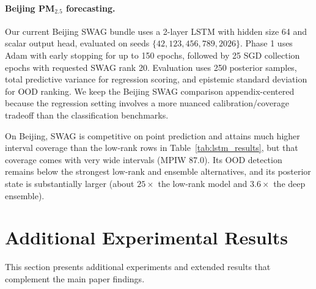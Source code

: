 \documentclass{article}
\theoremstyle{plain}
\theoremstyle{definition}
\theoremstyle{remark}
\begin{document}
\paragraph{Beijing PM$_{2.5}$ forecasting.}
Our current Beijing SWAG bundle uses a 2-layer LSTM with hidden size 64 and scalar output head, evaluated on seeds $\{42,123,456,789,2026\}$. Phase 1 uses Adam with early stopping for up to 150 epochs, followed by 25 SGD collection epochs with requested SWAG rank 20. Evaluation uses 250 posterior samples, total predictive variance for regression scoring, and epistemic standard deviation for OOD ranking. We keep the Beijing SWAG comparison appendix-centered because the regression setting involves a more nuanced calibration/coverage tradeoff than the classification benchmarks.

\begin{table}[t]
\centering
\caption{Supplementary SWAG results on Beijing PM$_{2.5}$ forecasting. Results are mean $\pm$ std over 5 seeds.}
\label{tab:swag_beijing}
\small
{}
\end{table}

On Beijing, SWAG is competitive on point prediction and attains much higher interval coverage than the low-rank rows in Table~\ref{tab:lstm_results}, but that coverage comes with very wide intervals (MPIW 87.0). Its OOD detection remains below the strongest low-rank and ensemble alternatives, and its posterior state is substantially larger (about $25\times$ the low-rank model and $3.6\times$ the deep ensemble).

% 
\section{Additional Experimental Results}\label{app:additional_results}

This section presents additional experiments and extended results that complement the main paper findings.
\end{document}
